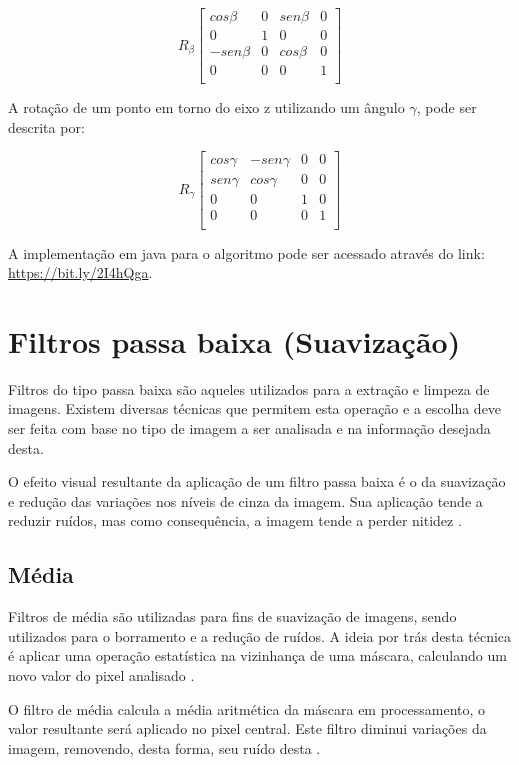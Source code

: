\documentclass[
	12pt,				%
	oneside,			%
	a4paper,			%
	english,			%
	french,				%
	spanish,			%
	brazil,				%
	]{abntex2}
\begin{document}
\[
R_\beta
\begin{bmatrix}
     cos\beta & 0 & sen\beta & 0   \\ 
	        0 & 1 & 0        & 0   \\ 
	-sen\beta & 0 & cos\beta & 0   \\ 
            0 & 0 &        0 & 1   \\ 
\end{bmatrix} 
\]

A rotação de um ponto em torno do eixo z utilizando um ângulo \(\gamma\), pode ser descrita por:

\[
R_\gamma
\begin{bmatrix}
    cos\gamma & -sen\gamma & 0 & 0   \\ 
	sen\gamma &  cos\gamma & 0 & 0   \\ 
	        0 &          0 & 1 & 0   \\ 
            0 &          0 & 0 & 1   \\ 
\end{bmatrix} 
\]

A implementação em java para o algoritmo pode ser acessado através do link: \url{https://bit.ly/2I4hQga}.

\section{Filtros passa baixa (Suavização)}
Filtros do tipo passa baixa são aqueles utilizados para a extração e limpeza de imagens. Existem diversas técnicas que permitem esta operação e a escolha deve ser feita com base no tipo de imagem a ser analisada e na informação desejada desta. 

O efeito visual resultante da aplicação de um filtro passa baixa é o da suavização e redução das variações nos níveis de cinza da imagem. Sua aplicação tende a reduzir ruídos, mas como consequência, a imagem tende a perder nitidez \cite{conciAzevedoLeta:2008}.

\subsection{Média}
Filtros de média são utilizadas para fins de suavização de imagens, sendo utilizados para o borramento e a redução de ruídos. A ideia por trás desta técnica é aplicar uma operação estatística na vizinhança de uma máscara, calculando um novo valor do pixel analisado \cite{gonzalesWoods:2008}. 

O filtro de média calcula a média aritmética da máscara em processamento, o valor resultante será aplicado no pixel central. Este filtro diminui variações da imagem, removendo, desta forma, seu ruído desta \cite{gonzalesWoods:2008}.
\end{document}
